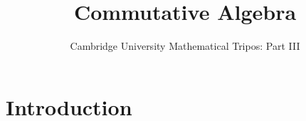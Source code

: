 \documentclass{article}
\title{Commutative Algebra}
\author{Cambridge University Mathematical Tripos: Part III}
\begin{document}
\maketitle

\tableofcontentsnewpage{}

\section{Introduction}

\end{document}
